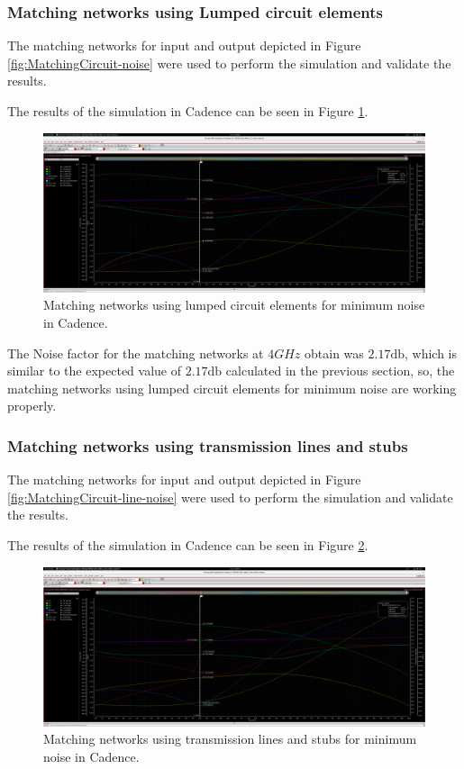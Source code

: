 \subsubsection{Matching networks using Lumped circuit elements}

The matching networks for input and output depicted in Figure \ref{fig:MatchingCircuit-noise} were used to perform the simulation and validate the results.

The results of the simulation in Cadence can be seen in Figure \ref{fig:CadenceNoiseMatchingCircuit}.
\begin{figure}[H]
    \centering
    \includegraphics[width=1\textwidth]{Images/CAD-LCmatchNoise.png}
    \caption{Matching networks using lumped circuit elements for minimum noise in Cadence.}
    \label{fig:CadenceNoiseMatchingCircuit}
\end{figure}

The Noise factor for the matching networks at $4 GHz$ obtain was $2.17 \si{\decibel}$, which is similar to the expected value of $2.17 \si{\decibel}$ calculated in the previous section, so, the matching networks using lumped circuit elements for minimum noise are working properly.

\subsubsection{Matching networks using transmission lines and stubs}

The matching networks for input and output depicted in Figure \ref{fig:MatchingCircuit-line-noise} were used to perform the simulation and validate the results.

The results of the simulation in Cadence can be seen in Figure \ref{fig:CadenceNoiseMatchingCircuitLine}.
\begin{figure}[H]
    \centering
    \includegraphics[width=1\textwidth]{Images/CAD-LinesmatchNoise.png}
    \caption{Matching networks using transmission lines and stubs for minimum noise in Cadence.}
    \label{fig:CadenceNoiseMatchingCircuitLine}
\end{figure}


